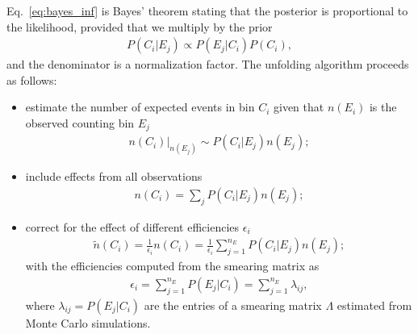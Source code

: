 Eq.~\ref{eq:bayes_inf} is Bayes' theorem stating that the posterior is proportional to the likelihood, provided that we multiply by the prior
%
\begin{align}
P(C_i | E_j) \propto P(E_j | C_i) P(C_i),
\end{align}
%
and the denominator is a normalization factor.
The unfolding algorithm proceeds as follows:
\begin{itemize}
\item
estimate the number of expected events in bin $C_i$ given that $n(E_i)$ is the observed counting bin $E_j$\\
\begin{align}
n(C_i)|_{n(E_j)} \sim P(C_i | E_j) n(E_j);
\end{align}
\item
include effects from all observations\\
\begin{align}
n(C_i) = \sum_j P(C_i | E_j) n(E_j);
\end{align}
\item
correct for the effect of different efficiencies $\epsilon_i$\\
\begin{align}\label{eq:IBU}
\tilde{n}(C_i) = \frac{1}{\epsilon_i} n(C_i) = \frac{1}{\epsilon_i}\sum_{j=1}^{n_E} P(C_i | E_j) n(E_j);
\end{align}
with the efficiencies computed from the smearing matrix as
\begin{align}
\epsilon_i = \sum_{j=1}^{n_E} P(E_j | C_i) = \sum_{j=1}^{n_E} \lambda_{ij},
\end{align}
where $\lambda_{ij} = P(E_j | C_i)$ are the entries of a smearing matrix $\Lambda$ estimated from Monte Carlo simulations. 
\end{itemize}

